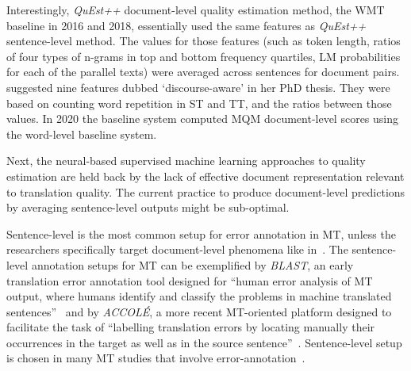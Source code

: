 Interestingly, \textit{QuEst++} document-level quality estimation method, the WMT baseline in 2016 and 2018, essentially used the same features as \textit{QuEst++} sentence-level method. The values for those features (such as token length, ratios of four types of n-grams in top and bottom frequency quartiles, LM probabilities for each of the parallel texts) were averaged across sentences for document pairs. \citet{Scarton2016} suggested nine features dubbed `discourse-aware' in her PhD thesis. They were based on counting word repetition in ST and TT, and the ratios between those values. In 2020 the baseline system computed MQM document-level scores using the word-level baseline system.

Next, the neural-based supervised machine learning approaches to quality estimation are held back by the lack of effective document representation relevant to translation quality. The current practice to produce document-level predictions by averaging sentence-level outputs might be sub-optimal.

Sentence-level is the most common setup for error annotation in MT, unless the researchers specifically target document-level phenomena like in~\citet{Voita2019, Laubli2018}. The sentence-level annotation setups for MT can be exemplified by \textit{BLAST}, an early translation error annotation tool designed for ``human error analysis of MT output, where humans identify and classify the problems in machine translated sentences''~\cite[p.56]{Stymne2011} and by \textit{ACCOL\'E}, a more recent MT-oriented platform designed to facilitate the task of ``labelling translation errors by locating manually their occurrences in the
target as well as in the source sentence''~\cite[p.28]{EsperancaRodier2019}. Sentence-level setup is chosen in many MT studies that involve error-annotation~\cite[see, for example,][]{vanBrussel2018}.

